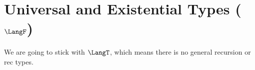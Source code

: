 \section{Universal and Existential Types ($\LangF$)}

We are going to stick with $\LangT$, which means there is no general recursion
or rec types.








